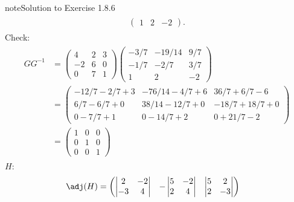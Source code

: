 \documentclass[letterpaper,10pt,english]{jupyterBook}
\begin{document}
\begin{sphinxadmonition}{note}{Solution to Exercise 1.8.6}
\begin{equation*}
\begin{split}
\begin{align*}
\begin{pmatrix}
         1   &   2    & -2
    \end{pmatrix}.
\end{align*} \end{split}
\end{equation*}
\sphinxAtStartPar
Check:
\begin{equation*}
\begin{split} \begin{align*}
    GG^{-1} &=
    \begin{pmatrix}
         4 & 2 & 3 \\
        -2 & 6 & 0 \\
         0 & 7 & 1 
    \end{pmatrix}
    \begin{pmatrix}
        -3/7 & -19/14 &  9/7 \\
        -1/7 &  -2/7  &  3/7 \\
         1   &   2    & -2
    \end{pmatrix} \\
    &=
    \begin{pmatrix}
        -12/7 - 2/7 + 3 & -76/14 -  4/7 + 6 &  36/7 +  6/7 - 6 \\
          6/7 - 6/7 + 0 &  38/14 - 12/7 + 0 & -18/7 + 18/7 + 0 \\
          0   - 7/7 + 1 &   0    - 14/7 + 2 &   0   + 21/7 - 2
    \end{pmatrix} \\
    &=
    \begin{pmatrix}
        1 & 0 & 0 \\
        0 & 1 & 0 \\
        0 & 0 & 1
    \end{pmatrix}
\end{align*} \end{split}
\end{equation*}
\sphinxAtStartPar
\(H\):
\begin{equation*}
\begin{split} \begin{align*}
    \adj(H) &=
    \begin{pmatrix}
          \begin{vmatrix} 2 & -2 \\ -3 & 4 \end{vmatrix}
        &
        - \begin{vmatrix} 5 & -2 \\ 2 & 4 \end{vmatrix}
        &
          \begin{vmatrix} 5 & 2 \\ 2 & -3 \end{vmatrix}

\end{pmatrix}
\end{align*}
\end{split}
\end{equation*}
\end{sphinxadmonition}
\end{document}
